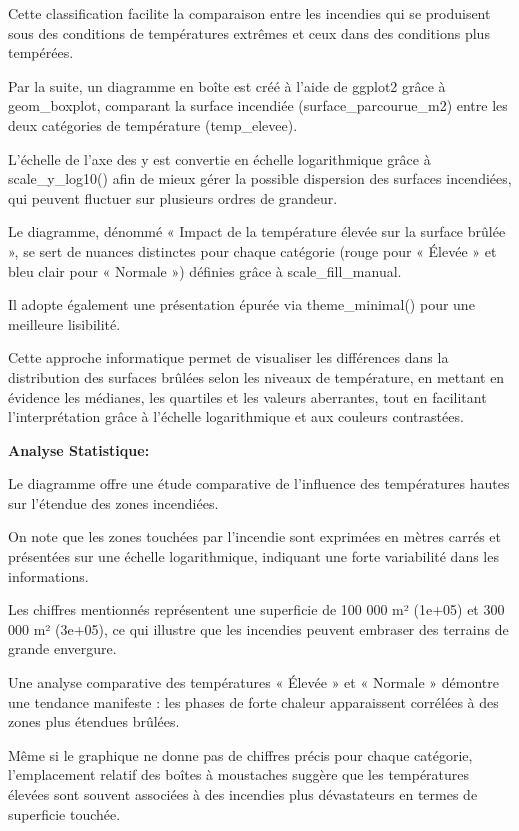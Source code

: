 \documentclass[
]{article}
\begin{document}
Cette classification facilite la comparaison entre les incendies qui se
produisent sous des conditions de températures extrêmes et ceux dans des
conditions plus tempérées.

Par la suite, un diagramme en boîte est créé à l'aide de ggplot2 grâce à
geom\_boxplot, comparant la surface incendiée (surface\_parcourue\_m2)
entre les deux catégories de température (temp\_elevee).

L'échelle de l'axe des y est convertie en échelle logarithmique grâce à
scale\_y\_log10() afin de mieux gérer la possible dispersion des
surfaces incendiées, qui peuvent fluctuer sur plusieurs ordres de
grandeur.

Le diagramme, dénommé « Impact de la température élevée sur la surface
brûlée », se sert de nuances distinctes pour chaque catégorie (rouge
pour « Élevée » et bleu clair pour « Normale ») définies grâce à
scale\_fill\_manual.

Il adopte également une présentation épurée via theme\_minimal() pour
une meilleure lisibilité.

Cette approche informatique permet de visualiser les différences dans la
distribution des surfaces brûlées selon les niveaux de température, en
mettant en évidence les médianes, les quartiles et les valeurs
aberrantes, tout en facilitant l'interprétation grâce à l'échelle
logarithmique et aux couleurs contrastées.

\textbf{Analyse Statistique:}

Le diagramme offre une étude comparative de l'influence des températures
hautes sur l'étendue des zones incendiées.

On note que les zones touchées par l'incendie sont exprimées en mètres
carrés et présentées sur une échelle logarithmique, indiquant une forte
variabilité dans les informations.

Les chiffres mentionnés représentent une superficie de 100 000 m²
(1e+05) et 300 000 m² (3e+05), ce qui illustre que les incendies peuvent
embraser des terrains de grande envergure.

Une analyse comparative des températures « Élevée » et « Normale »
démontre une tendance manifeste : les phases de forte chaleur
apparaissent corrélées à des zones plus étendues brûlées.

Même si le graphique ne donne pas de chiffres précis pour chaque
catégorie, l'emplacement relatif des boîtes à moustaches suggère que les
températures élevées sont souvent associées à des incendies plus
dévastateurs en termes de superficie touchée.
\end{document}

